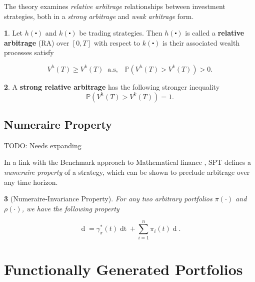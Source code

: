\documentclass[british]{amsart} \usepackage{lmodern}
\numberwithin{equation}{section} \numberwithin{figure}{section}
\theoremstyle{plain} \newtheorem{thm}{\protect\theoremname}[section]
\theoremstyle{definition} \newtheorem{defn}[thm]{\protect\definitionname}
\theoremstyle{plain} \newtheorem{assumption}[thm]{\protect\assumptionname}
\theoremstyle{plain} \newtheorem{lem}[thm]{\protect\lemmaname}
\theoremstyle{plain} \newtheorem{prop}[thm]{\protect\propositionname}
\theoremstyle{remark} \newtheorem{rem}[thm]{\protect\remarkname}
\theoremstyle{plain} \newtheorem{cor}[thm]{\protect\corollaryname}
\renewcommand{\d}[1]{\mathop{\mathrm{d}{#1}}}
\begin{document}
The theory examines \textit{relative arbitrage} relationships between investment
strategies, both in a \textit{strong arbitrage} and \textit{weak arbitrage}
form.

\begin{defn}
  Let $h(\centerdot)$ and $k(\centerdot)$ be trading strategies. Then
  $h(\centerdot)$ is called a \textbf{relative arbitrage} (RA) over
  $[0,T]$ with respect to $k(\centerdot)$ is their associated wealth
  processes satisfy

  \begin{equation}
    V^{h}(T)\ge V^{k}(T)\;\;\text{a.s},\;\;\;\mathbb{P}(V^{h}(T)>V^{k}(T))>0.
  \end{equation}
\end{defn}

\begin{defn}
  A \textbf{strong relative arbitrage} has the following stronger inequality
  \begin{equation}
    \mathbb{P}(V^{h}(T)>V^{k}(T))=1.
  \end{equation}
\end{defn}

\subsection{Numeraire Property}

TODO: Needs expanding

In a link with the Benchmark approach to Mathematical finance
\cite{platen2006}, SPT defines a \textit{numeraire property} of a strategy,
which can be shown to preclude arbitrage over any time horizon.

\begin{lem} [Numeraire-Invariance Property]
 For any two arbitrary portfolios $\pi(\cdot)$ and $\rho(\cdot)$, we have the
following property 

  \begin{equation} 
    \label{eq:numeraireinvarianceproperty}
    \d{ \log{ \left( \frac{ V^{\pi}(t) }{ V^{\rho}(t) } \right)} } = 
      \gamma_{\pi}^{*}(t)\d{t} + 
      \sum_{i=1}^{n} \pi_{i}(t) \d{ \log{ 
      \left(
        \frac{ X_{i}(t) }{ V^{\rho}(t)} 
      \right) }}. 
  \end{equation}
\end{lem}


\newpage
\section{Functionally Generated Portfolios}
\end{document}
